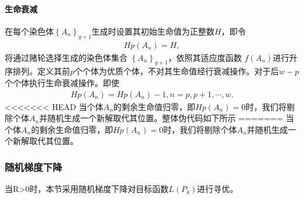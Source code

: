 \documentclass{whutmod}
\begin{document}
\begin{table}[H]
\begin{tablenotes}
		\paragraph{生命衰减}
		在每个染色体$\left \{A_n  \right \}_{g+1}$生成时设置其初始生命值为正整数$H$，即令
	\begin{gather}
	Hp(A_n)=H,
	\end{gather}
	将通过赌轮选择生成的染色体集合 $\left \{A_n  \right \}_{g+1}$，依照其适应度函数
	$f(A_n)$进行升序排列。定义其前$p$个个体为优质个体，不对其生命值经行衰减操作。对于后$w-p$个个体执行生命衰减操作。即使
		\begin{gather}
		Hp(A_n)=Hp(A_n)-1,n=p,p+1,\cdots,w.
		\end{gather}
<<<<<<< HEAD
    当个体$A_n$的剩余生命值归零，即$Hp(A_n)=0$时，我们将剔除个体$A_n$并随机生成一个新解取代其位置。整体伪代码如下所示	
=======
    当个体$A_n$的剩余生命值归零，即$Hp(A_n)=0$时，我们将剔除个体$A_n$并随机生成一个新解取代其位置。

	\subsubsection{随机梯度下降}	
    	 当R>0时，本节采用随机梯度下降对目标函数$L(P_k)$进行寻优。


\end{tablenotes}
\end{table}
\end{document}
